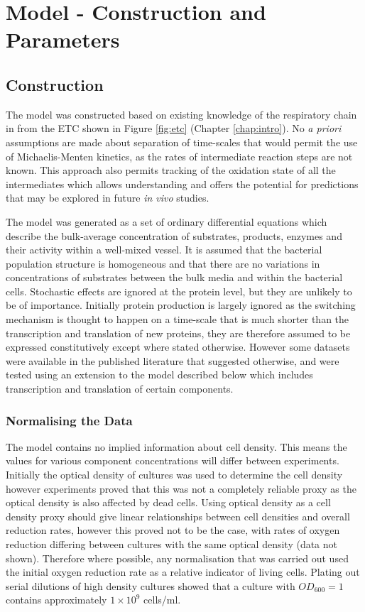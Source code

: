 \chapter{Model - Construction and Parameters}
\label{chap:model}
\section{Construction}

The model was constructed based on existing knowledge of the respiratory chain in \Nsm{} from the ETC shown in Figure \ref{fig:etc} (Chapter \ref{chap:intro}). No \textit{a priori} assumptions are made about separation of time-scales that would permit the use of Michaelis-Menten kinetics, as the rates of intermediate reaction steps are not known. This approach also permits tracking of the oxidation state of all the intermediates which allows understanding and offers the potential for predictions that may be explored in future \textit{in vivo} studies.

The model was generated as a set of ordinary differential equations which describe the bulk-average concentration of substrates, products, enzymes and their activity within a well-mixed vessel. It is assumed that the bacterial population structure is homogeneous and that there are no variations in concentrations of substrates between the bulk media and within the bacterial cells. Stochastic effects are ignored at the protein level, but they are unlikely to be of importance. Initially protein production is largely ignored as the switching mechanism is thought to happen on a time-scale that is much shorter than the transcription and translation of new proteins, they are therefore assumed to be expressed constitutively except where stated otherwise. However some datasets were available in the published literature\cite{Rock2005} that suggested otherwise, and were tested using an extension to the model described below which includes transcription and translation of certain components.

\subsection{Normalising the Data}
The model contains no implied information about cell density. This means the values for various component concentrations will differ between experiments.
Initially the optical density of cultures was used to determine the cell density however experiments proved that this was not a completely reliable proxy as the optical density is also affected by dead cells. Using optical density as a cell density proxy should give linear relationships between cell densities and overall reduction rates, however this proved not to be the case, with rates of oxygen reduction differing between cultures with the same optical density (data not shown). Therefore where possible, any normalisation that was carried out used the initial oxygen reduction rate as a relative indicator of living cells. Plating out serial dilutions of high density cultures showed that a culture with $OD_{600} = 1$ contains approximately $1 \times 10^9$ cells/ml.

